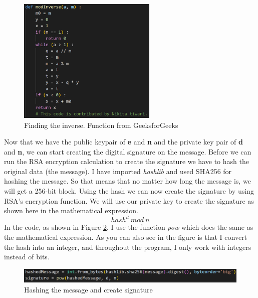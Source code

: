 \documentclass[12pt, letterpaper]{article}
\begin{document}
\begin{figure}[H]
  \includegraphics[width=250px]{code_snippets/modinv.PNG}\centering
  \caption{Finding the inverse. Function from GeeksforGeeks}
  \label{fig:modinv}
\end{figure}

Now that we have the public keypair of \textbf{e} and \textbf{n} and the private key pair of \textbf{d} and \textbf{n}, we can start creating the digital signature on the message. Before we can run the RSA encryption calculation to create the signature we have to hash the original data (the message). I have imported \textit{hashlib} and used SHA256 for hashing the message. So that means that no matter how long the message is, we will get a 256-bit block.
Using the hash we can now create the signature by using RSA's encryption function. We will use our private key to create the signature as shown here in the mathematical expression.
$$hash^{d}\ mod\ n$$
In the code, as shown in Figure \ref{fig:hash}, I use the function \textit{pow} which does the same as the mathematical expression. As you can also see in the figure is that I convert the hash into an integer, and throughout the program, I only work with integers instead of bits.

\begin{figure}[H]
  \includegraphics[width=\linewidth]{code_snippets/hash.PNG}\centering
  \caption{Hashing the message and create signature}
  \label{fig:hash}
\end{figure}
\end{document}
